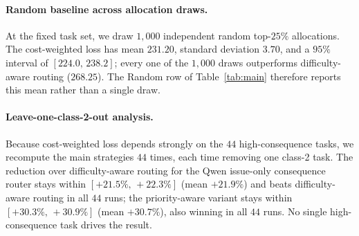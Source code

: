 \documentclass{article}
\begin{document}
\begin{table}[h]
\centering
\caption{\textbf{Task-level bootstrap} over $5{,}000$ resamples of the
$300$ SWE-bench Lite tasks at the top-$25\%$ matched-compute operating
point. Point estimates match Table~\ref{tab:main}; intervals are
$2.5$--$97.5$ percentile ranges over resamples.}
\label{tab:bootstrap}
\small
{}
\end{table}

\paragraph{Random baseline across allocation draws.} At the fixed task
set, we draw $1{,}000$ independent random top-$25\%$ allocations. The
cost-weighted loss has mean $231.20$, standard deviation $3.70$, and a
$95\%$ interval of $[224.0,\,238.2]$; every one of the $1{,}000$ draws
outperforms difficulty-aware routing ($268.25$). The Random row of
Table~\ref{tab:main} therefore reports this mean rather than a single
draw.

\paragraph{Leave-one-class-2-out analysis.} Because cost-weighted loss
depends strongly on the $44$ high-consequence tasks, we recompute the
main strategies $44$ times, each time removing one class-2 task. The
reduction over difficulty-aware routing for the Qwen issue-only
consequence router stays within $[+21.5\%,\,+22.3\%]$ (mean
$+21.9\%$) and beats difficulty-aware routing in all $44$ runs; the
priority-aware variant stays within $[+30.3\%,\,+30.9\%]$ (mean
$+30.7\%$), also winning in all $44$ runs. No single high-consequence
task drives the result.
\end{document}
